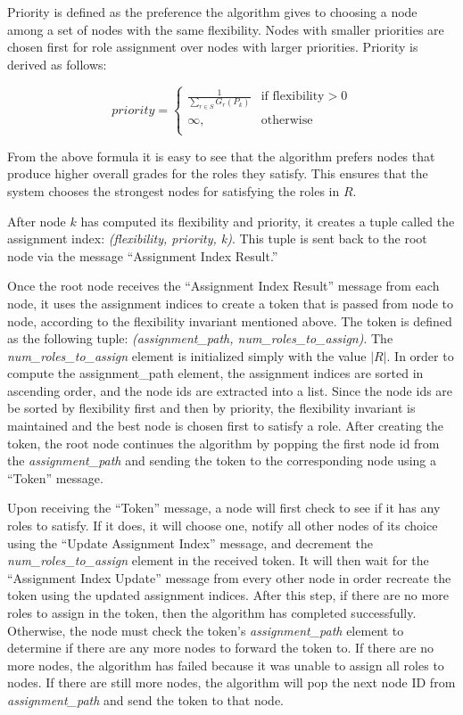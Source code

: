 \documentclass[11pt]{article}
\begin{document}
\begin{multicols}{2}
Priority is defined as the preference the algorithm gives to choosing a node among a set of nodes with the same flexibility. Nodes with smaller priorities are chosen first for role assignment over nodes with larger priorities. Priority is derived as follows:

\begin{equation*}
     priority = \begin{cases}
               \frac{1}{\sum_{r \in S }G_{r}(P_{k}) }               & \text{if flexibility} > 0\\
               \infty,               & \text{otherwise}\\
           \end{cases}
\end{equation*}

From the above formula it is easy to see that the algorithm prefers nodes that produce higher overall grades for the roles they satisfy. This ensures that the system chooses the strongest nodes for satisfying the roles in $R$.

After node $k$ has computed its flexibility and priority, it creates a tuple called the assignment index: \textit{(flexibility, priority, k)}. This tuple is sent back to the root node via the message ``Assignment Index Result.''

Once the root node receives the ``Assignment Index Result'' message from each node, it uses the assignment indices to create a token that is passed from node to node, according to the flexibility invariant mentioned above. The token is defined as the following tuple: \textit{(assignment\_path, num\_roles\_to\_assign)}. The \textit{num\_roles\_to\_assign} element is initialized simply with the value $|R|$. In order to compute the assignment\_path element, the assignment indices are sorted in ascending order, and the node ids are extracted into a list. Since the node ids are be sorted by flexibility first and then by priority, the flexibility invariant is maintained and the best node is chosen first to satisfy a role. After creating the token, the root node continues the algorithm by popping the first node id from the \textit{assignment\_path} and sending the token to the corresponding node using a ``Token'' message.

Upon receiving the ``Token'' message, a node will first check to see if it has any roles to satisfy. If it does, it will choose one, notify all other nodes of its choice using the ``Update Assignment Index'' message, and decrement the \textit{num\_roles\_to\_assign} element in the received token. It will then wait for the ``Assignment Index Update'' message from every other node in order recreate the token using the updated assignment indices. After this step, if there are no more roles to assign in the token, then the algorithm has completed successfully. Otherwise, the node must check the token's \textit{assignment\_path} element to determine if there are any more nodes to forward the token to. If there are no more nodes, the algorithm has failed because it was unable to assign all roles to nodes. If there are still more nodes, the algorithm will pop the next node ID from \textit{assignment\_path} and send the token to that node.


\end{multicols}
\end{document}
